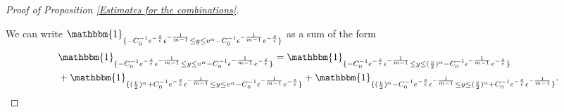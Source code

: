 \documentclass[11pt]{article}
\numberwithin{equation}{section}
\begin{document}
\begin{proof}[Proof of Proposition \ref{Estimates for the combinations}]
\begin{rmk}
\end{rmk}
 We can write $\mathbbm{1}_{\{-C_{0}^{-1}e^{-\frac{s}{\epsilon}}\epsilon^{-\frac{1}{m-1}}\leq y\leq v^{\alpha}-C_{0}^{-1}\epsilon^{-\frac{1}{m-1}}e^{-\frac{s}{\epsilon}}\}}$ as a sum of the form 
 \begin{align*}
     &\mathbbm{1}_{\{-C_{0}^{-1}e^{-\frac{s}{\epsilon}}\epsilon^{-\frac{1}{m-1}}\leq y\leq v^{\alpha}-C_{0}^{-1}\epsilon^{-\frac{1}{m-1}}e^{-\frac{s}{\epsilon}}\}}=\mathbbm{1}_{\{-C_{0}^{-1}e^{-\frac{s}{\epsilon}}\epsilon^{-\frac{1}{m-1}}\leq y\leq (\frac{v}{2})^{\alpha}-C_{0}^{-1}\epsilon^{-\frac{1}{m-1}}e^{-\frac{s}{\epsilon}}\}}\\
     &+\mathbbm{1}_{\{(\frac{v}{2})^{\alpha}+C_{0}^{-1}e^{-\frac{s}{\epsilon}}\epsilon^{-\frac{1}{m-1}}\leq y\leq v^{\alpha}-C_{0}^{-1}\epsilon^{-\frac{1}{m-1}}e^{-\frac{s}{\epsilon}}\}}+\mathbbm{1}_{\{(\frac{v}{2})^{\alpha}-C_{0}^{-1}e^{-\frac{s}{\epsilon}}\epsilon^{-\frac{1}{m-1}}\leq y\leq (\frac{v}{2})^{\alpha}+C_{0}^{-1}e^{-\frac{s}{\epsilon}}\epsilon^{-\frac{1}{m-1}}\}}.
 \end{align*} 
 


\end{proof}
\end{document}
